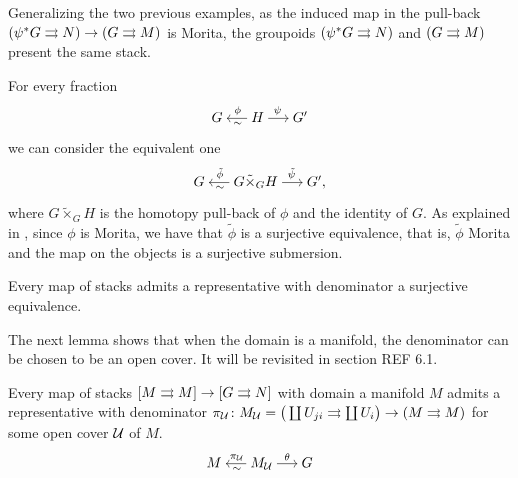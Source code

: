 \begin{example}
Generalizing the two previous examples, as the induced map in the pull-back $(\psi^*G\rightrightarrows N) \to (G\rightrightarrows M)$ is Morita, the groupoids $(\psi^*G\rightrightarrows N)$ and $(G\rightrightarrows M)$ present the same stack.
\end{example}


For every fraction
\begin{equation}
\begin{tikzcd}[sep = small]
  G & H \ar[shorten = -.15em]{l}[pos=.45, sloped, below]{\sim}[pos=.45, sloped, above]{\phi} \ar[shorten = -.15em]{r}[pos=.45]{\psi} & G'
\end{tikzcd}
\end{equation}
we can consider the equivalent one
\begin{equation}
\begin{tikzcd}[sep = small]
 G & G\tilde\times_G H \ar[shorten = -.15em]{l}[pos=.45, sloped, below]{\sim}[pos=.45, sloped, above]{\tilde\phi} \ar[shorten = -.15em]{r}[pos=.45]{\tilde\psi} & G' ,
\end{tikzcd}
\end{equation}
where $G\tilde\times_G H$ is the homotopy pull-back of $\phi$ and the identity of $G$.
As explained in \cite[Prop.\ 4.4.4]{dh13}, since $\phi$ is Morita, we have that $\tilde\phi$ is a surjective equivalence, that is, $\tilde\phi$ Morita and the map on the objects is a surjective submersion.

\begin{lemma}
Every map of stacks admits a representative with denominator a surjective equivalence.
\end{lemma}

The next lemma shows that when the domain is a manifold, the denominator can be chosen to be an open cover.
It will be revisited in section REF 6.1.

\begin{lemma}\label{representative}
Every map of stacks $[M\rightrightarrows M]\to [G\rightrightarrows N]$ with domain a manifold $M$ admits a representative with denominator \( \pi_{\mathcal{U}}\colon M_{\mathcal{U}} = \big( \coprod U_{ji}\rightrightarrows \coprod U_i \big) \to (M\rightrightarrows M) \) for some open cover $\mathcal{U}$ of $M$.
\begin{equation}
\begin{tikzcd}[sep = small]
  M & M_\U \ar[shorten = -.15em]{l}[pos=.45, sloped, below]{\sim}[pos=.45, sloped, above]{\pi_\U} \ar[shorten = -.15em]{r}{\theta} & G
\end{tikzcd}
\end{equation}
\end{lemma}

